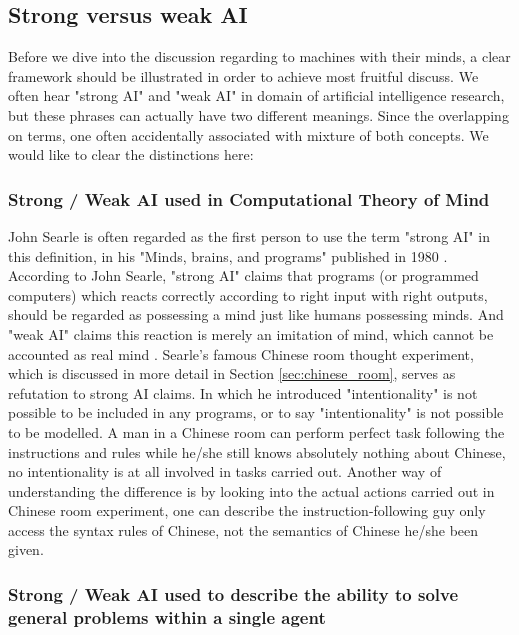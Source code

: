 \documentclass[11pt]{article}
\begin{document}
\subsection{Strong versus weak AI}

Before we dive into the discussion regarding to machines with their minds, a clear framework should be illustrated in order to achieve most fruitful discuss. We often hear "strong AI" and "weak AI" in domain of artificial intelligence research, but these phrases can actually have two different meanings. Since the overlapping on terms, one often accidentally associated with mixture of both concepts. We would like to clear the distinctions here: 

\subsubsection*{Strong / Weak AI used in Computational Theory of Mind}

John Searle is often regarded as the first person to use the term "strong AI" in this definition, in his "Minds, brains, and programs" published in 1980 \cite{searle1980minds}. According to John Searle, "strong AI" claims that programs (or programmed computers) which reacts correctly according to right input with right outputs, should be regarded as possessing a mind just like humans possessing minds. And "weak AI" claims this reaction is merely an imitation of mind, which cannot be accounted as real mind . Searle's famous Chinese room thought experiment, which is discussed in more detail in Section \ref{sec:chinese_room}, serves as refutation to strong AI claims. In which he introduced "intentionality" is not possible to be included in any programs, or to say "intentionality" is not possible to be modelled. A man in a Chinese room can perform perfect task following the instructions and rules while he/she still knows absolutely nothing about Chinese, no intentionality is at all involved in tasks carried out. Another way of understanding the difference is by looking into the actual actions carried out in Chinese room experiment, one can describe the instruction-following guy only access the syntax rules of Chinese, not the semantics of Chinese he/she been given.

\subsubsection*{Strong / Weak AI used to describe the ability to solve general problems within a single agent}
\end{document}
